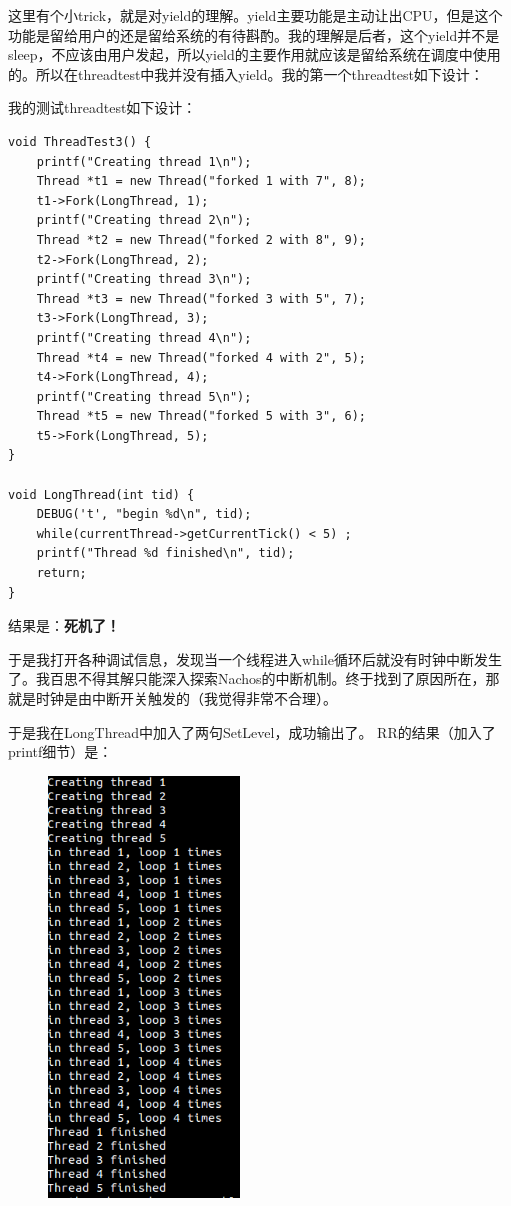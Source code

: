 \documentclass{ctexart}
\begin{document}
这里有个小trick，就是对yield的理解。yield主要功能是主动让出CPU，但是这个功能是留给用户的还是留给系统的有待斟酌。我的理解是后者，这个yield并不是sleep，不应该由用户发起，所以yield的主要作用就应该是留给系统在调度中使用的。所以在threadtest中我并没有插入yield。我的第一个threadtest如下设计：

我的测试threadtest如下设计：
\begin{lstlisting}
void ThreadTest3() {
    printf("Creating thread 1\n");
    Thread *t1 = new Thread("forked 1 with 7", 8);
    t1->Fork(LongThread, 1);
    printf("Creating thread 2\n");
    Thread *t2 = new Thread("forked 2 with 8", 9);
    t2->Fork(LongThread, 2);
    printf("Creating thread 3\n");
    Thread *t3 = new Thread("forked 3 with 5", 7);
    t3->Fork(LongThread, 3);
    printf("Creating thread 4\n");
    Thread *t4 = new Thread("forked 4 with 2", 5);
    t4->Fork(LongThread, 4);
    printf("Creating thread 5\n");
    Thread *t5 = new Thread("forked 5 with 3", 6);
    t5->Fork(LongThread, 5);
}

void LongThread(int tid) {
    DEBUG('t', "begin %d\n", tid);
    while(currentThread->getCurrentTick() < 5) ;
    printf("Thread %d finished\n", tid);
    return;
}
\end{lstlisting}

结果是：\textbf{死机了！}

于是我打开各种调试信息，发现当一个线程进入while循环后就没有时钟中断发生了。我百思不得其解只能深入探索Nachos的中断机制。终于找到了原因所在，那就是时钟是由中断开关触发的（我觉得非常不合理）。

于是我在LongThread中加入了两句SetLevel，成功输出了。
RR的结果（加入了printf细节）是：
\begin{figure}[h]
 \centering
\includegraphics[width=2in]{ex24.png}
\end{figure}
\end{document}
